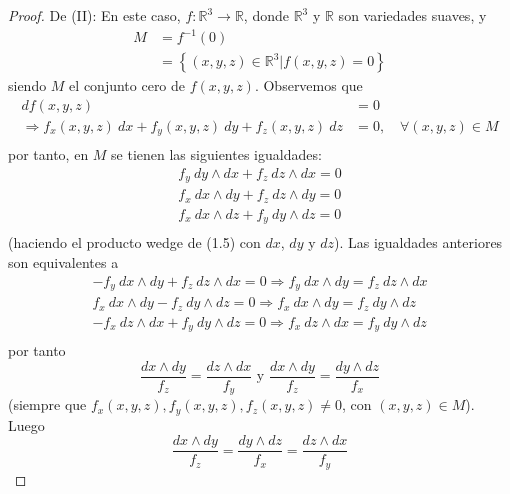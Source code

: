 \documentclass[12pt]{report}
\theoremstyle{largebreak}
\newcommand\cf[3]{\ensuremath{#1:#2\rightarrow#3}}
\begin{document}
\begin{proof}
        De (II): En este caso, $\cf{f}{\mathbb{R}^3}{\mathbb{R}}$, donde $\mathbb{R}^3$ y $\mathbb{R}$ son variedades suaves, y
        \begin{equation*}
            \begin{split}
                M&=f^{-1}(0)\\
                &=\left\{(x,y,z)\in\mathbb{R}^3|f(x,y,z)=0\right\}
            \end{split}
        \end{equation*}
        siendo $M$ el conjunto cero de $f(x,y,z)$. Observemos que
        \begin{equation}
            \begin{split}
                df(x,y,z)&=0\\
                \Rightarrow f_x(x,y,z)\:dx+f_y(x,y,z)\:dy+f_z(x,y,z)\:dz&=0,\quad\forall (x,y,z)\in M\\
            \end{split}
        \end{equation}
        por tanto, en $M$ se tienen las siguientes igualdades:
        \begin{equation*}
            \begin{split}
                f_y\:dy\wedge dx+f_z\:dz\wedge dx=0\\
                f_x\:dx\wedge dy+f_z\:dz\wedge dy=0\\
                f_x\:dx\wedge dz+f_y\:dy\wedge dz=0\\
            \end{split}
        \end{equation*}
        (haciendo el producto wedge de (1.5) con $dx$, $dy$ y $dz$). Las igualdades anteriores son equivalentes a
        \begin{equation*}
            \begin{split}
                -f_y\:dx\wedge dy+f_z\:dz\wedge dx=0\Rightarrow f_y\:dx\wedge dy=f_z\:dz\wedge dx \\
                f_x\:dx\wedge dy-f_z\:dy\wedge dz=0\Rightarrow f_x\:dx\wedge dy=f_z\:dy\wedge dz\\
                -f_x\:dz\wedge dx+f_y\:dy\wedge dz=0\Rightarrow f_x\:dz\wedge dx=f_y\:dy\wedge dz \\
            \end{split}
        \end{equation*}
        por tanto
        \begin{equation*}
            \frac{dx\wedge dy}{f_z}=\frac{dz\wedge dx}{f_y}\text{ y }\frac{dx\wedge dy}{f_z}=\frac{dy\wedge dz}{f_x}
        \end{equation*}
        (siempre que $f_x(x,y,z),f_y(x,y,z),f_z(x,y,z)\neq 0$, con $(x,y,z)\in M$). Luego
        \begin{equation}
            \frac{dx\wedge dy}{f_z}=\frac{dy\wedge dz}{f_x}=\frac{dz\wedge dx}{f_y}
        \end{equation}
        

\end{proof}
\end{document}
